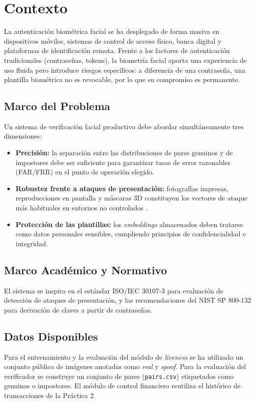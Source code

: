 \section{Contexto}
\label{sec:contexto}

La autenticación biométrica facial se ha desplegado de forma masiva en dispositivos móviles, sistemas de control de acceso físico, banca digital y plataformas de identificación remota. Frente a los factores de autenticación tradicionales (contraseñas, tokens), la biometría facial aporta una experiencia de uso fluida pero introduce riesgos específicos: a diferencia de una contraseña, una plantilla biométrica no es revocable, por lo que su compromiso es permanente.

\subsection{Marco del Problema}
\label{subsec:marco}

Un sistema de verificación facial productivo debe abordar simultáneamente tres dimensiones:

\begin{itemize}
    \item \textbf{Precisión:} la separación entre las distribuciones de pares genuinos y de impostores debe ser suficiente para garantizar tasas de error razonables (FAR/FRR) en el punto de operación elegido.
    \item \textbf{Robustez frente a ataques de presentación:} fotografías impresas, reproducciones en pantalla y máscaras 3D constituyen los vectores de ataque más habituales en entornos no controlados \cite{ramachandra2017pad}.
    \item \textbf{Protección de las plantillas:} los \textit{embeddings} almacenados deben tratarse como datos personales sensibles, cumpliendo principios de confidencialidad e integridad.
\end{itemize}

\subsection{Marco Académico y Normativo}
\label{subsec:marco_academico}

El sistema se inspira en el estándar ISO/IEC 30107-3 \cite{iso30107} para evaluación de detección de ataques de presentación, y las recomendaciones del NIST SP 800-132 \cite{nist800132} para derivación de claves a partir de contraseñas.

\subsection{Datos Disponibles}
\label{subsec:datos}

Para el entrenamiento y la evaluación del módulo de \textit{liveness} se ha utilizado un conjunto público de imágenes anotadas como \textit{real} y \textit{spoof}. Para la evaluación del verificador se construye un conjunto de pares (\texttt{pairs.csv}) etiquetados como genuinos o impostores. El módulo de control financiero reutiliza el histórico de transacciones de la Práctica 2.
